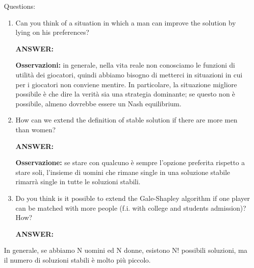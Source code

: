 \documentclass[pt11,a4paper,twoside,reqno,openright]{paper}
\begin{document}

\noindent Questions:
\begin{enumerate}
	\item Can you think of a situation in which a man can improve 
		the solution by lying on his preferences?

		\noindent \textbf{ANSWER:} 

		\noindent \textbf{Osservazioni:} in generale, nella vita 
		reale non conosciamo le funzioni di utilità dei giocatori, 
		quindi abbiamo bisogno di metterci in situazioni in cui 
		per i giocatori non conviene mentire. In particolare, la 
		situazione migliore possibile è che dire la verità sia una 
		strategia dominante; se questo non è possibile, almeno 
		dovrebbe essere un Nash equilibrium.

	\item How can we extend the definition of stable solution if there 
		are more men than women?

		\noindent \textbf{ANSWER:} 

		\noindent \textbf{Osservazione:} se stare con qualcuno è 
		sempre l'opzione preferita rispetto a stare soli, l'insieme 
		di uomini che rimane single in una soluzione stabile 
		rimarrà single in tutte le soluzioni stabili.

	\item Do you think is it possible to extend the Gale-Shapley algorithm 
		if one player can be matched with more people (f.i. with 
		college and students admission)? How?

		\noindent \textbf{ANSWER:}
\end{enumerate}

\noindent In generale, se abbiamo N uomini ed N donne, esistono N! possibili 
soluzioni, ma il numero di soluzioni stabili è molto più piccolo.
\end{document}
